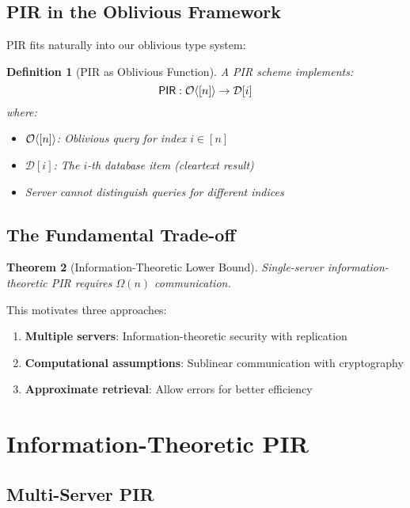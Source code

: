 \documentclass[11pt,final,hidelinks]{article}
\newcommand{\DB}{\mathcal{D}}
\newcommand{\Index}[1]{[#1]}
\newtheorem{theorem}{Theorem}[section]
\newtheorem{definition}[theorem]{Definition}
\begin{document}
\subsection{PIR in the Oblivious Framework}

PIR fits naturally into our oblivious type system:

\begin{definition}[PIR as Oblivious Function]
A PIR scheme implements:
\begin{equation}
\mathsf{PIR}: \Obv{\Index{n}} \to \DB\Index{i}
\end{equation}
where:
\begin{itemize}
    \item $\Obv{\Index{n}}$: Oblivious query for index $i \in [n]$
    \item $\DB\Index{i}$: The $i$-th database item (cleartext result)
    \item Server cannot distinguish queries for different indices
\end{itemize}
\end{definition}

\subsection{The Fundamental Trade-off}

\begin{theorem}[Information-Theoretic Lower Bound]
Single-server information-theoretic PIR requires $\Omega(n)$ communication.
\end{theorem}

This motivates three approaches:
\begin{enumerate}
    \item \textbf{Multiple servers}: Information-theoretic security with replication
    \item \textbf{Computational assumptions}: Sublinear communication with cryptography
    \item \textbf{Approximate retrieval}: Allow errors for better efficiency
\end{enumerate}

\section{Information-Theoretic PIR}

\subsection{Multi-Server PIR}
\end{document}
